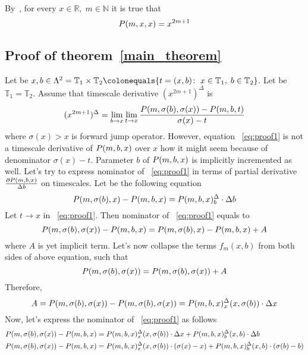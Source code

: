 By~\cite[Lemma 3.1]{kolosov2016link}, for every $x\in\mathbb{R}, \; m\in\mathbb{N}$ it is true that
\begin{equation}
    \label{eq:odd_power_identity}
    P ( m, x, x ) = x^{2m+1}
\end{equation}

\subsection{Proof of theorem~\ref{main_theorem}}
\label{subsec:proof-of-theorem}
Let be
$x,b\in \Lambda^2 = \mathbb{T}_1 \times \mathbb{T}_2
\colonequals \{t = (x,b) \colon \; x\in\mathbb{T}_1, \; b\in\mathbb{T}_2\}$.
Let be $\mathbb{T}_1 = \mathbb{T}_2$.
Assume that timescale derivative $(x^{2m+1})^{\Delta}$ is
\begin{equation}
    \label{eq:proof1}
    (x^{2m+1})^{\Delta}
    = \lim \limits_{b \to x}
    \lim \limits_{t \to x}
    \frac{P ( m, \sigma(b), \sigma(x) ) - P ( m, b, t )}{\sigma(x) - t}
\end{equation}
where $\sigma(x) > x$ is forward jump operator.
However, equation ~\eqref{eq:proof1} is not a timescale derivative of $P ( m, b, x )$ over $x$
how it might seem because of denominator $\sigma(x) - t$.
Parameter $b$ of $P ( m, b, x )$ is implicitly incremented as well.
Let's try to express nominator of ~\eqref{eq:proof1} in terms of
partial derivative $\frac{\partial P ( m, b, x )}{\Delta b}$ on timescales.
Let be the following equation
\[
    P ( m, \sigma(b), x ) - P ( m, b, x )
    = P ( m, b, x )^{\Delta}_{b} \cdot \Delta b
\]
Let $t \to x$ in ~\eqref{eq:proof1}.
Then nominator of ~\eqref{eq:proof1} equals to
\[
    P ( m, \sigma(b), \sigma(x) ) - P ( m, b, x )
    = P ( m, \sigma(b), x ) - P ( m, b, x ) + A
\]
where $A$ is yet implicit term.
Let's now collapse the terms $f_m (x, b)$ from both sides of above equation, such that
\[
    P ( m, \sigma(b), \sigma(x) ) = P ( m, \sigma(b), \sigma(x) ) + A
\]
Therefore,
\[
    A = P ( m, \sigma(b), \sigma(x) ) - P ( m, \sigma(b), \sigma(x) )
    = P ( m, b, x )^{\Delta}_{x} (x, \sigma(b)) \cdot \Delta x
\]
Now, let's express the nominator of ~\eqref{eq:proof1} as follows
\begin{align*}
    P ( m, \sigma(b), \sigma(x) ) - P ( m, b, x )
    &= P ( m, b, x )^{\Delta}_{x} (x, \sigma(b)) \cdot \Delta x + P ( m, b, x )^{\Delta}_{b} (x,b) \cdot \Delta b \\
    P ( m, \sigma(b), \sigma(x) ) - P ( m, b, x )
    &= P ( m, b, x )^{\Delta}_{x} (x, \sigma(b)) \cdot (\sigma(x) - x) + P ( m, b, x )^{\Delta}_{b} (x,b) \cdot (\sigma(b) - b)
\end{align*}
